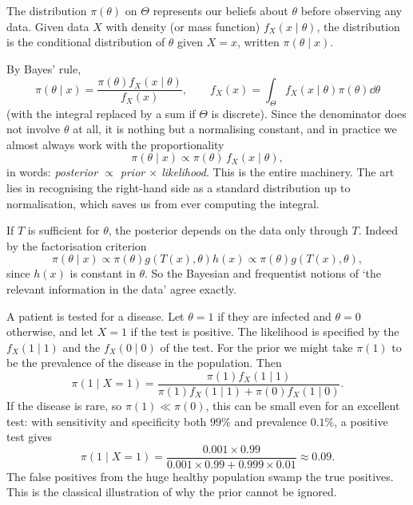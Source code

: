 \begin{definition}
  The  distribution $\pi(\theta)$ on $\Theta$ represents our beliefs about $\theta$ before observing any data. Given data $X$ with density (or mass function) $f_X(x \mid \theta)$, the  distribution is the conditional distribution of $\theta$ given $X = x$, written $\pi(\theta \mid x)$.
\end{definition}

By Bayes' rule,
$$
\pi(\theta \mid x) = \frac{\pi(\theta) f_X(x\mid\theta)}{f_X(x)}, \qquad f_X(x) = \int_\Theta f_X(x\mid\theta)\pi(\theta)\dd\theta
$$
(with the integral replaced by a sum if $\Theta$ is discrete). Since the denominator does not involve $\theta$ at all, it is nothing but a normalising constant, and in practice we almost always work with the proportionality
$$
\pi(\theta\mid x) \propto \pi(\theta)\, f_X(x\mid\theta),
$$
in words: \emph{posterior $\propto$ prior $\times$ likelihood}. This is the entire machinery. The art lies in recognising the right-hand side as a standard distribution up to normalisation, which saves us from ever computing the integral.

\begin{remark}
  If $T$ is sufficient for $\theta$, the posterior depends on the data only through $T$. Indeed by the factorisation criterion
  $$
  \pi(\theta \mid x) \propto \pi(\theta)g(T(x),\theta)h(x) \propto \pi(\theta)g(T(x),\theta),
  $$
  since $h(x)$ is constant in $\theta$. So the Bayesian and frequentist notions of `the relevant information in the data' agree exactly.
\end{remark}

\begin{example}
  A patient is tested for a disease. Let $\theta = 1$ if they are infected and $\theta = 0$ otherwise, and let $X = 1$ if the test is positive. The likelihood is specified by the  $f_X(1 \mid 1)$ and the  $f_X(0\mid 0)$ of the test. For the prior we might take $\pi(1)$ to be the prevalence of the disease in the population. Then
  $$
  \pi(1 \mid X = 1) = \frac{\pi(1)f_X(1\mid 1)}{\pi(1)f_X(1\mid 1) + \pi(0)f_X(1 \mid 0)}.
  $$
  If the disease is rare, so $\pi(1) \ll \pi(0)$, this can be small even for an excellent test: with sensitivity and specificity both $99\%$ and prevalence $0.1\%$, a positive test gives
  $$
  \pi(1\mid X=1) = \frac{0.001 \times 0.99}{0.001\times 0.99 + 0.999 \times 0.01} \approx 0.09.
  $$
  The false positives from the huge healthy population swamp the true positives. This is the classical illustration of why the prior cannot be ignored.
\end{example}

